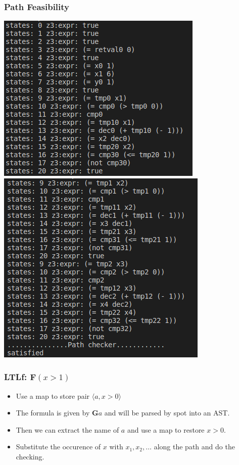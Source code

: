 \documentclass[11pt]{beamer}
\begin{document}
\begin{frame}\frametitle{Path Feasibility}
\begin{center}
\includegraphics[scale=0.4]{p4.png}
\includegraphics[scale=0.4]{p5.png}
\end{center}
\end{frame}


\begin{frame}\frametitle{LTLf: $\mathbf{F}(x > 1)$}

\begin{itemize}
\item Use a map to store pair $\langle a, x > 0\rangle$
\item 
The formula is given by $\mathbf{G}a$ and will be parsed by spot into an AST.
\item Then we can extract the name of $a$ and use a map to restore $x > 0$.
\item Substitute the occurence of $x$ with $x_1, x_2, \ldots$ along the path and do the checking.
\end{itemize}

\end{frame}
\end{document}
